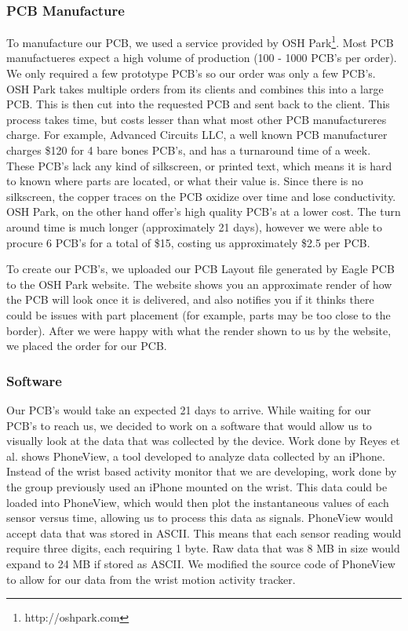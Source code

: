 \subsubsection{PCB Manufacture}
To manufacture our PCB, we used a service provided by OSH Park\footnote{http://oshpark.com}.
Most PCB manufactueres expect a high volume of production (100 - 1000 PCB's per order).
We only required a few prototype PCB's so our order was only a few PCB's.
OSH Park takes multiple orders from its clients and combines this into a large PCB.
This is then cut into the requested PCB and sent back to the client.
This process takes time, but costs lesser than what most other PCB manufactureres charge.
For example,
Advanced Circuits LLC,
a well known PCB manufacturer charges \$120 for 4 bare bones PCB's,
and has a turnaround time of a week.
These PCB's lack any kind of silkscreen,
or printed text,
which means it is hard to known where parts are located,
or what their value is.
Since there is no silkscreen,
the copper traces on the PCB oxidize over time and lose conductivity.
OSH Park,
on the other hand offer's high quality PCB's at a lower cost.
The turn around time is much longer (approximately 21 days),
however we were able to procure 6 PCB's for a total of \$15,
costing us approximately \$2.5 per PCB.

To create our PCB's, we uploaded our PCB Layout file generated by Eagle PCB to the OSH Park website.
The website shows you an approximate render of how the PCB will look once it is delivered,
and also notifies you if it thinks there could be issues with part placement (for example, parts may be too close to the border).
After we were happy with what the render shown to us by the website,
we placed the order for our PCB.

\subsubsection{Software}
\label{Sec:Software}
Our PCB's would take an expected 21 days to arrive. While waiting for our PCB's to reach us,
we decided to work on a software that would allow us to visually look at the data that was collected by the device.
Work done by Reyes et al. \cite{concha2014study} shows PhoneView,
a tool developed to analyze data collected by an iPhone.
Instead of the wrist based activity monitor that we are developing,
work done by the group previously used an iPhone mounted on the wrist.
This data could be loaded into PhoneView,
which would then plot the instantaneous values of each sensor versus time,
allowing us to process this data as signals.
PhoneView would accept data that was stored in ASCII.
This means that each sensor reading would require three digits,
each requiring 1 byte.
Raw data that was 8 MB in size would expand to 24 MB if stored as ASCII.
We modified the source code of PhoneView to allow for our data from the wrist motion activity tracker.

